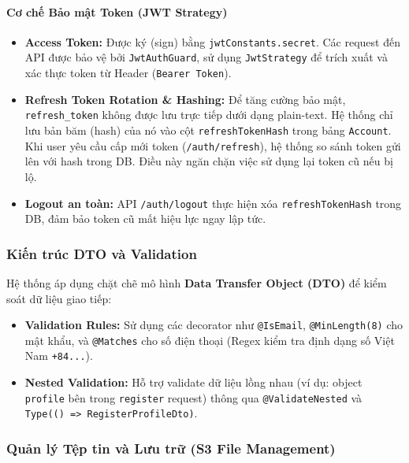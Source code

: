 \paragraph{Cơ chế Bảo mật Token (JWT Strategy)}
\begin{itemize}
    \item \textbf{Access Token:} Được ký (sign) bằng \texttt{jwtConstants.secret}. Các request đến API được bảo vệ bởi \texttt{JwtAuthGuard}, sử dụng \texttt{JwtStrategy} để trích xuất và xác thực token từ Header (\texttt{Bearer Token}).
    
    \item \textbf{Refresh Token Rotation \& Hashing:} Để tăng cường bảo mật, \texttt{refresh\_token} không được lưu trực tiếp dưới dạng plain-text. Hệ thống chỉ lưu bản băm (hash) của nó vào cột \texttt{refreshTokenHash} trong bảng \texttt{Account}. Khi user yêu cầu cấp mới token (\texttt{/auth/refresh}), hệ thống so sánh token gửi lên với hash trong DB. Điều này ngăn chặn việc sử dụng lại token cũ nếu bị lộ.
    
    \item \textbf{Logout an toàn:} API \texttt{/auth/logout} thực hiện xóa \texttt{refreshTokenHash} trong DB, đảm bảo token cũ mất hiệu lực ngay lập tức.
\end{itemize}

\subsubsection{Kiến trúc DTO và Validation}

Hệ thống áp dụng chặt chẽ mô hình \textbf{Data Transfer Object (DTO)} để kiểm soát dữ liệu giao tiếp:

\begin{itemize}
    \item \textbf{Validation Rules:} Sử dụng các decorator như \texttt{@IsEmail}, \texttt{@MinLength(8)} cho mật khẩu, và \texttt{@Matches} cho số điện thoại (Regex kiểm tra định dạng số Việt Nam \texttt{+84...}).
    
    \item \textbf{Nested Validation:} Hỗ trợ validate dữ liệu lồng nhau (ví dụ: object \texttt{profile} bên trong \texttt{register} request) thông qua \texttt{@ValidateNested} và \texttt{Type(() => RegisterProfileDto)}.
\end{itemize}

\subsubsection{Quản lý Tệp tin và Lưu trữ (S3 File Management)}

